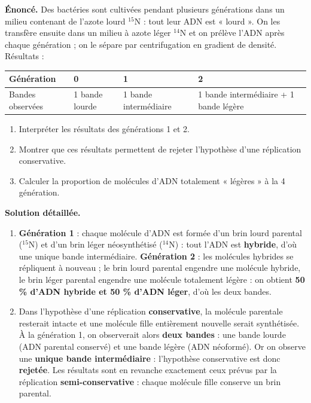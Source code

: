 \documentclass[11pt]{article}
\begin{document}
\begin{exoresolu}
\textbf{Énoncé.} Des bactéries sont cultivées pendant plusieurs générations dans un milieu contenant de l'azote lourd $^{15}$N : tout leur ADN est « lourd ». On les transfère ensuite dans un milieu à azote léger $^{14}$N et on prélève l'ADN après chaque génération ; on le sépare par centrifugation en gradient de densité. Résultats :
\begin{center}
\begin{tabularx}{\linewidth}{|l|X|X|X|}\hline
\rowcolor{popblueL} \textbf{Génération} & \textbf{0} & \textbf{1} & \textbf{2} \\ \hline
Bandes observées & 1 bande lourde & 1 bande intermédiaire & 1 bande intermédiaire + 1 bande légère \\ \hline
\end{tabularx}
\end{center}
\begin{enumerate}
\item Interpréter les résultats des générations 1 et 2.
\item Montrer que ces résultats permettent de rejeter l'hypothèse d'une réplication conservative.
\item Calculer la proportion de molécules d'ADN totalement « légères » à la 4\ieme{} génération.
\end{enumerate}
\tcblower
\textbf{Solution détaillée.}
\begin{enumerate}
\item \textbf{Génération 1} : chaque molécule d'ADN est formée d'un brin lourd parental ($^{15}$N) et d'un brin léger néosynthétisé ($^{14}$N) : tout l'ADN est \textbf{hybride}, d'où une unique bande intermédiaire. \textbf{Génération 2} : les molécules hybrides se répliquent à nouveau ; le brin lourd parental engendre une molécule hybride, le brin léger parental engendre une molécule totalement légère : on obtient \textbf{50 \% d'ADN hybride et 50 \% d'ADN léger}, d'où les deux bandes.
\item Dans l'hypothèse d'une réplication \textbf{conservative}, la molécule parentale resterait intacte et une molécule fille entièrement nouvelle serait synthétisée. À la génération 1, on observerait alors \textbf{deux bandes} : une bande lourde (ADN parental conservé) et une bande légère (ADN néoformé). Or on observe une \textbf{unique bande intermédiaire} : l'hypothèse conservative est donc \textbf{rejetée}. Les résultats sont en revanche exactement ceux prévus par la réplication \textbf{semi-conservative} : chaque molécule fille conserve un brin parental.

\end{enumerate}
\end{exoresolu}
\end{document}
